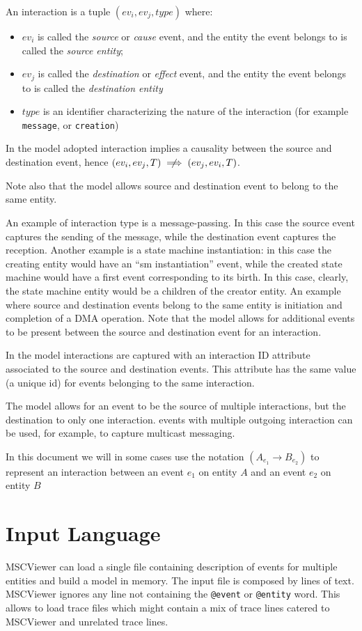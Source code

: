 \documentclass[11pt, twoside, titlepage]{book}
\makeatletter
\newcommand{\prog}{MSCViewer}
\newcommand{\mscevent}{\texttt{@event}}
\newcommand{\mscentity}{\texttt{@entity}}
\makeatother
\begin{document}
An interaction is a tuple $(ev_i, ev_j, type)$ where:
\begin{itemize}
  \item $ev_i$ is called the {\it source} or {\it cause} event, and the entity
  the event belongs to is called the {\it source entity};
  \item $ev_j$ is called the {\it destination} or {\it effect} event, and the
  entity the event belongs to is called the {\it destination entity}
  \item $type$ is an identifier characterizing the nature of the interaction
  (for example \texttt{message}, or \texttt{creation})
\end{itemize}
In the model adopted interaction implies a causality between the source and
destination event, hence $(ev_i, ev_j, T) \centernot\implies (ev_j, ev_i, T)$. 

Note also that the model allows source and destination event to belong to the
same entity.

An example of interaction type is a message-passing. In this case the source
event captures the sending of the message, while the destination event captures
the reception. Another example is a state machine instantiation:
in this case the creating entity would have an ``sm instantiation'' event, while
the created state machine would have a first event corresponding to its birth.
In this case, clearly, the state machine entity would be a children of the
creator entity. An example where source and destination events belong to the
same entity is initiation and completion of a DMA operation. 
Note that the model allows for additional events
to be present between the source and destination event for an interaction.

In the model interactions are captured with an interaction ID attribute
associated to the source and destination events. This attribute has the same
value (a unique id) for events belonging to the same  interaction.

The model allows for an event to be the source of multiple interactions, but
the destination to only one interaction. events with multiple outgoing
interaction can be used, for example, to capture multicast messaging.

In this document we will in some cases use the notation $(A_{e_1} \rightarrow
B_{e_2})$ to represent an interaction between an event $e_1$ on entity $A$ and
an event $e_2$ on entity $B$

\section{Input Language}
\prog{} can load a single file containing description of events for multiple
entities and build a model in memory. The input file is composed by lines of
text. \prog{} ignores any line not containing the \mscevent{} or
\mscentity{} word. This allows to load trace files which might contain
a mix of trace lines catered to \prog{} and unrelated trace lines.
\end{document}
